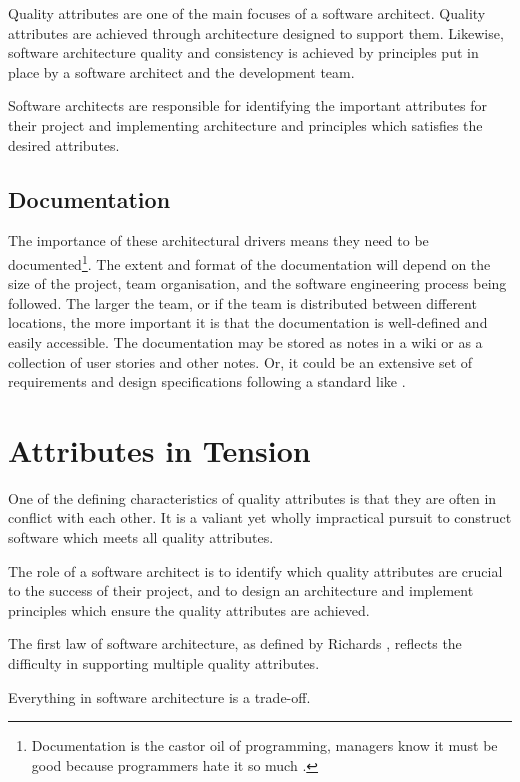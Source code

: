 Quality attributes are one of the main focuses of a software architect.
Quality attributes are achieved through architecture designed to support them.
Likewise, software architecture quality and consistency is achieved by principles put in place by a software architect and the development team.

Software architects are responsible for identifying the important attributes for their project
and implementing architecture and principles which satisfies the desired attributes.

\subsection{Documentation}
The importance of these architectural drivers means they need to be documented\footnote{Documentation is the castor oil of programming,
managers know it must be good because programmers hate it so much \cite{psychprog}.}.
The extent and format of the documentation will depend on the size of the project, team organisation,
and the software engineering process being followed.
The larger the team, or if the team is distributed between different locations,
the more important it is that the documentation is well-defined and easily accessible.
The documentation may be stored as notes in a wiki or as a collection of user stories and other notes.
Or, it could be an extensive set of requirements and design specifications following a standard like
.

\section{Attributes in Tension}
One of the defining characteristics of quality attributes is that they are often in conflict with each other.
It is a valiant yet wholly impractical pursuit to construct software which meets all quality attributes.

The role of a software architect is to identify which quality attributes are crucial to the success of their project,
and to design an architecture and implement principles which ensure the quality attributes are achieved.

\filbreak
The first law of software architecture, as defined by Richards \cite{richards2020fundamentals}, reflects the difficulty in supporting multiple quality attributes.

\begin{definition}
Everything in software architecture is a trade-off.
\end{definition}

